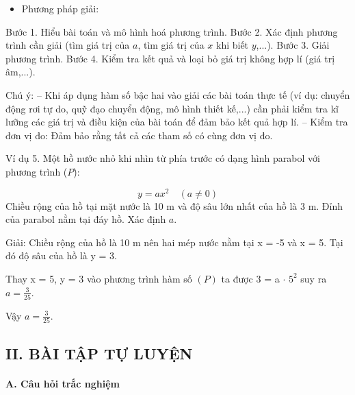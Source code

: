 \documentclass[%
    fontsize=12pt,%
    chapterprefix=false,%
    open=right,%
    twoside=false,%
    numbers=noenddot,%
    headings=optiontohead,%
    final,%
    DIV=15,%
    parskip=half %
]{scrbook}
\begin{document}
\begin{itemize}
  \item Phương pháp giải:
\end{itemize}

  Bước 1. Hiểu bài toán và mô hình hoá phương trình.   Bước 2. Xác định phương trình cần giải (tìm giá trị của $ a $, tìm giá trị của $ x $ khi biết $ y $,...).   Bước 3. Giải phương trình.   Bước 4. Kiểm tra kết quả và loại bỏ giá trị không hợp lí (giá trị âm,...).

Chú ý: -- Khi áp dụng hàm số bậc hai vào giải các bài toán thực tế (ví dụ: chuyển động rơi tự do, quỹ đạo chuyển động, mô hình thiết kế,...) cần phải kiểm tra kĩ lưỡng các giá trị và điều kiện của bài toán để đảm bảo kết quả hợp lí. -- Kiểm tra đơn vị đo: Đảm bảo rằng tất cả các tham số có cùng đơn vị đo.

Ví dụ 5. Một hồ nước nhỏ khi nhìn từ phía trước có dạng hình parabol với phương trình ($ P $):

\[ y = ax^2 \quad (a \neq 0) \]
Chiều rộng của hồ tại mặt nước là 10 m và độ sâu lớn nhất của hồ là 3 m. Đỉnh của parabol nằm tại đáy hồ. Xác định $ a $.


Giải: Chiều rộng của hồ là 10 m nên hai mép nước nằm tại x = -5 và x = 5. Tại đó độ sâu của hồ là y = 3.

Thay x = 5, y = 3 vào phương trình hàm số $(P)$ ta được 3 = a $\cdot$ $5^2$ suy ra $ a = \frac{3}{25} $.

Vậy $ a = \frac{3}{25} $.
\subsection{II. BÀI TẬP TỰ LUYỆN}
\paragraph{A. Câu hỏi trắc nghiệm}
\end{document}
